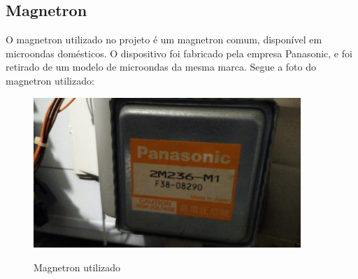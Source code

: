 \subsection{Magnetron}
O magnetron utilizado no projeto é um magnetron comum, disponível em microondas domésticos. O dispositivo foi fabricado pela empresa Panasonic, e foi retirado de um modelo de microondas da mesma marca. Segue a foto do magnetron utilizado:

\begin{figure}[H]
    \centering
    \caption{Magnetron utilizado}
    \includegraphics[width=0.9\textwidth]{./dados/figuras/magnetron-usado}
    \label{fig:figura-magnetron-usado}
\end{figure}

